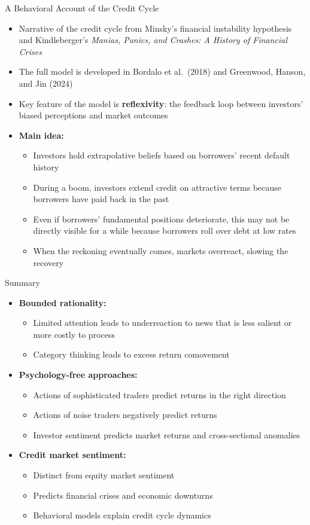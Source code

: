 \documentclass[aspectratio=169, 11pt]{beamer}
\begin{document}
\begin{frame}{A Behavioral Account of the Credit Cycle}
\begin{itemize}
\item Narrative of the credit cycle from Minsky's financial instability hypothesis and Kindleberger's \textit{Manias, Panics, and Crashes: A History of Financial Crises}
\item The full model is developed in Bordalo et al.\ (2018) and Greenwood, Hanson, and Jin (2024)
\item Key feature of the model is \textbf{reflexivity}: the feedback loop between investors' biased perceptions and market outcomes
\item \textbf{Main idea:}
  \begin{itemize}
  \item Investors hold extrapolative beliefs based on borrowers' recent default history
  \item During a boom, investors extend credit on attractive terms because borrowers have paid back in the past
  \item Even if borrowers' fundamental positions deteriorate, this may not be directly visible for a while because borrowers roll over debt at low rates
  \item When the reckoning eventually comes, markets overreact, slowing the recovery
  \end{itemize}
\end{itemize}
\end{frame}

\begin{frame}{Summary}
\begin{itemize}
\item \textbf{Bounded rationality:}
  \begin{itemize}
  \item Limited attention leads to underreaction to news that is less salient or more costly to process
  \item Category thinking leads to excess return comovement
  \end{itemize}
\item \textbf{Psychology-free approaches:}
  \begin{itemize}
  \item Actions of sophisticated traders predict returns in the right direction
  \item Actions of noise traders negatively predict returns
  \item Investor sentiment predicts market returns and cross-sectional anomalies   
  \end{itemize}
\item \textbf{Credit market sentiment:}
  \begin{itemize}
  \item Distinct from equity market sentiment
  \item Predicts financial crises and economic downturns
  \item Behavioral models explain credit cycle dynamics
  \end{itemize}
\end{itemize}
\end{frame}
\end{document}
